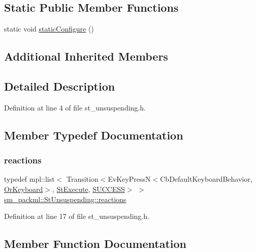 \subsection*{Static Public Member Functions}
\begin{DoxyCompactItemize}
\item 
static void \hyperlink{structsm__packml_1_1StUnsuspending_a43b80d56cb694840d8ef946f11b91edb}{static\+Configure} ()
\end{DoxyCompactItemize}
\subsection*{Additional Inherited Members}


\subsection{Detailed Description}


Definition at line 4 of file st\+\_\+unsuspending.\+h.



\subsection{Member Typedef Documentation}
\mbox{\label{structsm__packml_1_1StUnsuspending_a3b12f7aa7f6d40e697bbc5b90e0f6f67}} 
\subsubsection{\texorpdfstring{reactions}{reactions}}
{\footnotesize\ttfamily typedef mpl\+::list$<$ Transition$<$Ev\+Key\+PressN$<$Cb\+Default\+Keyboard\+Behavior, \hyperlink{classsm__packml_1_1OrKeyboard}{Or\+Keyboard}$>$, \hyperlink{structsm__packml_1_1StExecute}{St\+Execute}, \hyperlink{classSUCCESS}{S\+U\+C\+C\+E\+SS}$>$ $>$ \hyperlink{structsm__packml_1_1StUnsuspending_a3b12f7aa7f6d40e697bbc5b90e0f6f67}{sm\+\_\+packml\+::\+St\+Unsuspending\+::reactions}}



Definition at line 17 of file st\+\_\+unsuspending.\+h.



\subsection{Member Function Documentation}
\mbox{\label{structsm__packml_1_1StUnsuspending_a53d33e8289d08f4f279fb68141bb1cdb}} 
